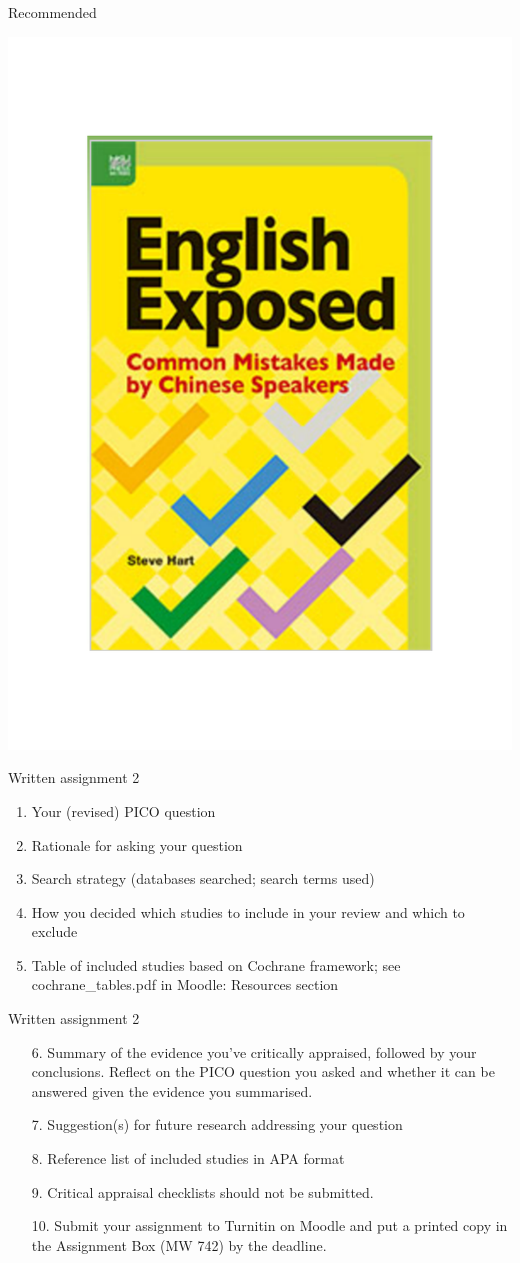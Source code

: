 \documentclass{beamer}
\begin{document}
% 
\begin{frame}{Recommended}
	\begin{center}
	\includegraphics[width=.55\textwidth]{images/hart_book_cover.pdf}
	\end{center}
	\nocite{Hart2017}
\end{frame}


% 
\begin{frame}{Written assignment 2}
	\begin{enumerate}
	\item Your (revised) PICO question
	\item Rationale for asking your question
	\item Search strategy (databases searched; search terms used)
	\item How you decided which studies to include in your review and which to exclude
	\item Table of included studies based on Cochrane framework; see cochrane\_tables.pdf in \alert{Moodle: Resources} section
	\end{enumerate}
\end{frame}

% 
\begin{frame}{Written assignment 2}
	\begin{enumerate}
	\item[6.] Summary of the evidence you've critically appraised, \alert{followed by your conclusions}. Reflect on the PICO question you asked and whether it can be answered given the evidence you summarised.
	\item[7.] Suggestion(s) for future research addressing your question
	\item[8.] Reference list of included studies in APA format
	\item[9.] Critical appraisal checklists should \alert{not} be submitted.
	\item [10.] Submit your assignment to Turnitin on Moodle and put a printed copy in the Assignment Box (MW 742) by the deadline.
	\end{enumerate} 
\end{frame}
\end{document}
